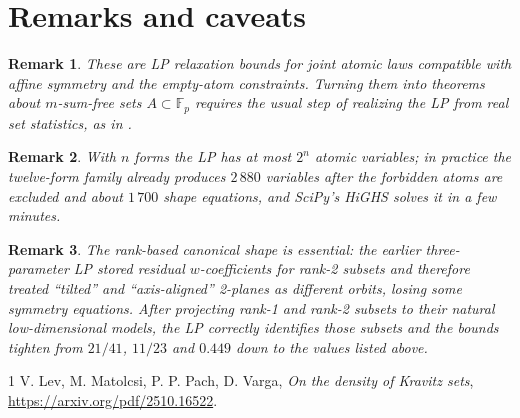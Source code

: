 \documentclass[11pt]{article}
\newtheorem{remark}{Remark}
\begin{document}
\section{Remarks and caveats}

\begin{remark}
These are \emph{LP relaxation} bounds for joint atomic laws compatible with
affine symmetry and the empty-atom constraints. Turning them into theorems
about $m$-sum-free sets $A\subset\mathbb{F}_p$ requires the usual step of
realizing the LP from real set statistics, as in \cite{LMPV}.
\end{remark}

\begin{remark}
With $n$ forms the LP has at most $2^n$ atomic variables; in practice the
twelve-form family already produces $2\,880$ variables after the forbidden
atoms are excluded and about $1\,700$ shape equations, and SciPy's HiGHS solves
it in a few minutes.
\end{remark}

\begin{remark}
The rank-based canonical shape is essential: the earlier three-parameter LP
stored residual $w$-coefficients for rank-2 subsets and therefore treated
``tilted'' and ``axis-aligned'' 2-planes as different orbits, losing some
symmetry equations. After projecting rank-1 and rank-2 subsets to their
natural low-dimensional models, the LP correctly identifies those subsets and
the bounds tighten from $21/41$, $11/23$ and $0.449$ down to the values listed
above.
\end{remark}

\begin{thebibliography}{1}
 V. Lev, M. Matolcsi, P. P. Pach, D. Varga,
\emph{On the density of Kravitz sets},
\url{https://arxiv.org/pdf/2510.16522}.
\end{thebibliography}
\end{document}
